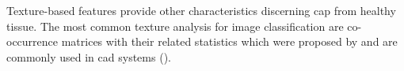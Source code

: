 \begin{enumerate}[leftmargin=*]
Texture-based features provide other characteristics discerning \ac{cap} from healthy tissue. The most common texture analysis for image classification are co-occurrence matrices with their related statistics which were proposed by \cite{Haralick1973} and are commonly used in \ac{cad} systems (\cite{Antic2013,Niaf2011,Niaf2012,Tiwari2009a,Tiwari2010,Tiwari2013,Viswanath2008,Viswanath2008a,Viswanath2011,Viswanath2012}).%
%

\end{enumerate}
